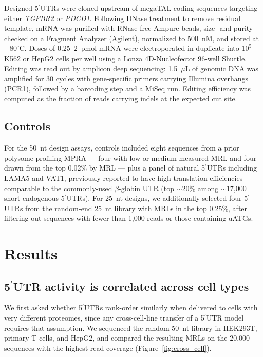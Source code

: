 \documentclass[11pt]{article}
\begin{document}
Designed 5$^\prime$UTRs were cloned upstream of megaTAL coding sequences
targeting either \emph{TGFBR2} or \emph{PDCD1}. Following DNase treatment
to remove residual template, mRNA was purified with RNase-free Ampure
beads, size- and purity-checked on a Fragment Analyzer (Agilent),
normalized to 500~nM, and stored at $-80^\circ$C. Doses of 0.25--2~pmol
mRNA were electroporated in duplicate into $10^{5}$ K562 or HepG2 cells
per well using a Lonza 4D-Nucleofector 96-well Shuttle. Editing was
read out by amplicon deep sequencing: 1.5~$\mu$L of genomic DNA was
amplified for 30 cycles with gene-specific primers carrying Illumina
overhangs (PCR1), followed by a barcoding step and a MiSeq run.
Editing efficiency was computed as the fraction of reads carrying
indels at the expected cut site.

\subsection{Controls}

For the 50~nt design assays, controls included eight sequences from a
prior polysome-profiling MPRA --- four with low or medium measured MRL
and four drawn from the top 0.02\% by MRL --- plus a panel of natural
5$^\prime$UTRs including LAMA5 and VAT1, previously reported to have
high translation efficiencies comparable to the commonly-used
$\beta$-globin UTR (top $\sim$20\% among $\sim$17{,}000 short endogenous
5$^\prime$UTRs). For 25~nt designs, we additionally selected four
5$^\prime$UTRs from the random-end 25~nt library with MRLs in the top
0.25\%, after filtering out sequences with fewer than 1{,}000 reads or
those containing uATGs.

\section{Results}

\subsection{5$^\prime$UTR activity is correlated across cell types}

We first asked whether 5$^\prime$UTRs rank-order similarly when delivered to
cells with very different proteomes, since any cross-cell-line transfer of a
5$^\prime$UTR model requires that assumption. We sequenced the random 50~nt
library in HEK293T, primary T cells, and HepG2, and compared the resulting
MRLs on the 20{,}000 sequences with the highest read coverage
(Figure~\ref{fig:cross_cell}).
\end{document}
